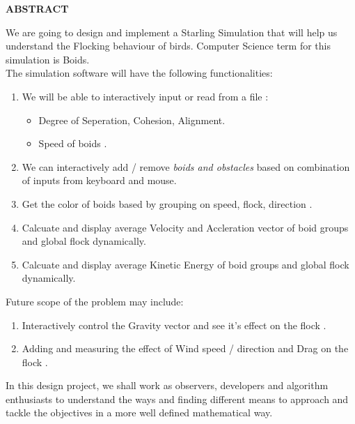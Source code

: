 \documentclass[12pt]{report}
\begin{document}
\newpage

\begin{center}
\Large \bf ABSTRACT
\end{center}
\vspace{0.2in}

We are going to design and implement a Starling Simulation that will help us understand the Flocking behaviour of birds. Computer Science term for this simulation is Boids.
\\
\vspace{0.3cm}
The simulation software will have the following functionalities:

\begin{enumerate}
  \item
  We will be able to interactively input or read from a file :
  \begin{itemize}
    \item
    Degree of Seperation, Cohesion, Alignment.  
    \item
    Speed of boids .
  \end{itemize}
  \item
  We can interactively add / remove \textit{ boids and obstacles } based on combination of inputs from keyboard and mouse. 
  \item
  Get the color of boids based by grouping on speed, flock, direction .
  \item
  Calcuate and display average Velocity and Accleration vector of boid groups and global flock dynamically.
  \item
  Calcuate and display average Kinetic Energy of boid groups and global flock dynamically.
\end{enumerate}


\vspace{0.5cm}
Future scope of the problem may include:

\begin{enumerate}
  \item
  Interactively control the Gravity vector and see it's effect on the flock .
  \item
  Adding and measuring the effect of Wind speed / direction and Drag on the flock .
\end{enumerate}


\vspace{0.5cm}

In this design project, we shall work as observers, developers and algorithm enthusiasts to understand the ways and finding different means to approach and tackle the objectives in a more well defined mathematical way. 
\end{document}
